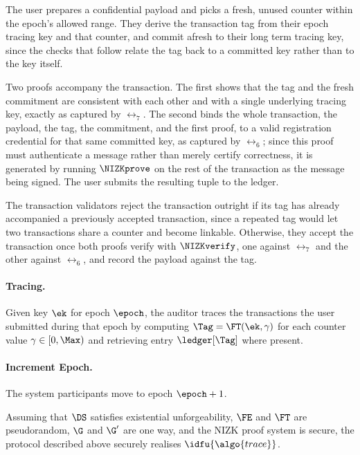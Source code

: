 The user prepares a confidential payload and picks a fresh, unused counter
within the epoch's allowed range. They derive the transaction tag from their
epoch tracing key and that counter, and commit afresh to their long term
tracing key, since the checks that follow relate the tag back to a committed
key rather than to the key itself.

Two proofs accompany the transaction. The first shows that the tag and the
fresh commitment are consistent with each other and with a single underlying
tracing key, exactly as captured by $\rel_7$. The second binds the whole
transaction, the payload, the tag, the commitment, and the first proof, to a
valid registration credential for that same committed key, as captured by
$\rel_6$; since this proof must authenticate a message rather than merely
certify correctness, it is generated by running $\NIZKprove$ on the rest of the
transaction as the message being signed. The user submits the resulting tuple
to the ledger.

The transaction validators reject the transaction outright if its tag has
already accompanied a previously accepted transaction, since a repeated tag
would let two transactions share a counter and become linkable. Otherwise, they
accept the transaction once both proofs verify with $\NIZKverify$, one against
$\rel_7$ and the other against $\rel_6$, and record the payload against the
tag.

\paragraph{Tracing.} Given key $\ek$ for epoch $\epoch$, the auditor traces the
transactions the user submitted during that epoch by computing $\Tag = \FT(\ek,
\gamma)$ for each counter value $\gamma \in [0,\Max)$ and retrieving entry
$\ledger[\Tag]$ where present.

\paragraph{Increment Epoch.} The system participants move to epoch $\epoch +
1$.

\begin{theorem}\label{thm:txid-bb} Assuming that $\DS$ satisfies existential
unforgeability, $\FE$ and $\FT$ are pseudorandom, $\G$ and $\G'$ are one way,
and the NIZK proof system is secure, the protocol described above securely
realises $\idfu{\algo{trace}}$.  \end{theorem}
